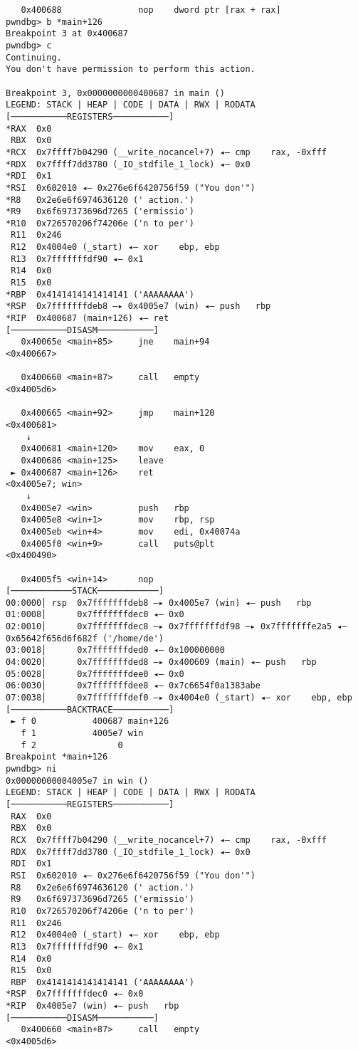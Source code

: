 \begin{lstlisting}
   0x400688               nop    dword ptr [rax + rax]
pwndbg> b *main+126
Breakpoint 3 at 0x400687
pwndbg> c
Continuing.
You don't have permission to perform this action.

Breakpoint 3, 0x0000000000400687 in main ()
LEGEND: STACK | HEAP | CODE | DATA | RWX | RODATA
[───────────REGISTERS───────────]
*RAX  0x0
 RBX  0x0
*RCX  0x7ffff7b04290 (__write_nocancel+7) ◂— cmp    rax, -0xfff
*RDX  0x7ffff7dd3780 (_IO_stdfile_1_lock) ◂— 0x0
*RDI  0x1
*RSI  0x602010 ◂— 0x276e6f6420756f59 ("You don'")
*R8   0x2e6e6f6974636120 (' action.')
*R9   0x6f697373696d7265 ('ermissio')
*R10  0x726570206f74206e ('n to per')
 R11  0x246
 R12  0x4004e0 (_start) ◂— xor    ebp, ebp
 R13  0x7fffffffdf90 ◂— 0x1
 R14  0x0
 R15  0x0
*RBP  0x4141414141414141 ('AAAAAAAA')
*RSP  0x7fffffffdeb8 —▸ 0x4005e7 (win) ◂— push   rbp
*RIP  0x400687 (main+126) ◂— ret    
[───────────DISASM───────────]
   0x40065e <main+85>     jne    main+94                       <0x400667>
 
   0x400660 <main+87>     call   empty                         <0x4005d6>
 
   0x400665 <main+92>     jmp    main+120                      <0x400681>
    ↓
   0x400681 <main+120>    mov    eax, 0
   0x400686 <main+125>    leave  
 ► 0x400687 <main+126>    ret                                  <0x4005e7; win>
    ↓
   0x4005e7 <win>         push   rbp
   0x4005e8 <win+1>       mov    rbp, rsp
   0x4005eb <win+4>       mov    edi, 0x40074a
   0x4005f0 <win+9>       call   puts@plt                      <0x400490>
 
   0x4005f5 <win+14>      nop    
[────────────STACK────────────]
00:0000│ rsp  0x7fffffffdeb8 —▸ 0x4005e7 (win) ◂— push   rbp
01:0008│      0x7fffffffdec0 ◂— 0x0
02:0010│      0x7fffffffdec8 —▸ 0x7fffffffdf98 —▸ 0x7fffffffe2a5 ◂— 0x65642f656d6f682f ('/home/de')
03:0018│      0x7fffffffded0 ◂— 0x100000000
04:0020│      0x7fffffffded8 —▸ 0x400609 (main) ◂— push   rbp
05:0028│      0x7fffffffdee0 ◂— 0x0
06:0030│      0x7fffffffdee8 ◂— 0x7c6654f0a1383abe
07:0038│      0x7fffffffdef0 —▸ 0x4004e0 (_start) ◂— xor    ebp, ebp
[───────────BACKTRACE───────────]
 ► f 0           400687 main+126
   f 1           4005e7 win
   f 2                0
Breakpoint *main+126
pwndbg> ni
0x00000000004005e7 in win ()
LEGEND: STACK | HEAP | CODE | DATA | RWX | RODATA
[───────────REGISTERS───────────]
 RAX  0x0
 RBX  0x0
 RCX  0x7ffff7b04290 (__write_nocancel+7) ◂— cmp    rax, -0xfff
 RDX  0x7ffff7dd3780 (_IO_stdfile_1_lock) ◂— 0x0
 RDI  0x1
 RSI  0x602010 ◂— 0x276e6f6420756f59 ("You don'")
 R8   0x2e6e6f6974636120 (' action.')
 R9   0x6f697373696d7265 ('ermissio')
 R10  0x726570206f74206e ('n to per')
 R11  0x246
 R12  0x4004e0 (_start) ◂— xor    ebp, ebp
 R13  0x7fffffffdf90 ◂— 0x1
 R14  0x0
 R15  0x0
 RBP  0x4141414141414141 ('AAAAAAAA')
*RSP  0x7fffffffdec0 ◂— 0x0
*RIP  0x4005e7 (win) ◂— push   rbp
[───────────DISASM───────────]
   0x400660 <main+87>     call   empty                         <0x4005d6>
 

\end{lstlisting}
